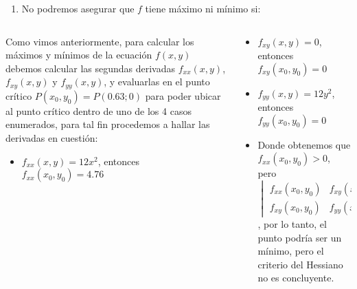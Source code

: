 \begin{columns}
\begin{column}{0.47\textwidth}
\begin{enumerate}
                    \item No podremos asegurar que $f$ tiene máximo ni mínimo si:
                    \\
                \end{enumerate}
            \end{column}
\end{columns}       

\framebreak

\begin{columns}
    \begin{column}{0.47\textwidth}
                \justify
                Como vimos anteriormente, para calcular los máximos y mínimos de la ecuación $f(x,y)$ debemos calcular las segundas derivadas $f_{xx}(x,y)$, $f_{xy}(x,y)$ y $f_{yy}(x,y)$, y evaluarlas en el punto crítico $P(x_{0},y_{0})=P(0.63;0)$ para poder ubicar al punto crítico dentro de uno de los 4 casos enumerados, para tal fin procedemos a hallar las derivadas en cuestión:
                \begin{itemize}

                    \item $f_{xx}(x,y)=12x^{2}$, entonces
                    \\$f_{xx}(x_{0},y_{0})=4.76$
                \end{itemize}
                    
            \end{column}
            \begin{column}{0.47\textwidth}
                \begin{itemize}
                    \setlength\itemsep{1em}
                    \item $f_{xy}(x,y)=0$, entonces
                    \\$f_{xy}(x_{0},y_{0})=0$
                    
                    \item $f_{yy}(x,y)=12y^{2}$, entonces
                    \\$f_{yy}(x_{0},y_{0})=0$
                    \item Donde obtenemos que $f_{xx}(x_{0},y_{0})>0$, pero $\begin{vmatrix}
                     f_{xx}(x_{0},y_{0}) & f_{xy}(x_{0},y_{0})\\
                     f_{xy}(x_{0},y_{0}) & f_{yy}(x_{0},y_{0})
                    \end{vmatrix}=0$, por lo tanto, el punto podría ser un mínimo, pero el criterio del Hessiano no es concluyente.
            \end{itemize}
         \end{column}
\end{columns}